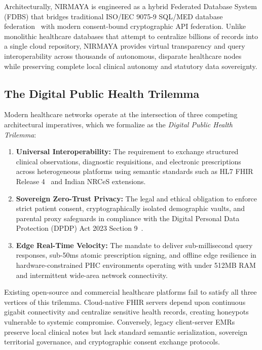 \documentclass[journal,twocolumn]{IEEEtran}
\begin{document}
Architecturally, NIRMAYA is engineered as a hybrid Federated Database System (FDBS) that bridges traditional ISO/IEC 9075-9 SQL/MED database federation~\cite{iso_sql_med} with modern consent-bound cryptographic API federation. Unlike monolithic healthcare databases that attempt to centralize billions of records into a single cloud repository, NIRMAYA provides virtual transparency and query interoperability across thousands of autonomous, disparate healthcare nodes while preserving complete local clinical autonomy and statutory data sovereignty.

\subsection{The Digital Public Health Trilemma}
Modern healthcare networks operate at the intersection of three competing architectural imperatives, which we formalize as the \emph{Digital Public Health Trilemma}:
\begin{enumerate}
    \item \textbf{Universal Interoperability:} The requirement to exchange structured clinical observations, diagnostic requisitions, and electronic prescriptions across heterogeneous platforms using semantic standards such as HL7 FHIR Release 4~\cite{hl7_fhir_r4} and Indian NRCeS extensions.
    \item \textbf{Sovereign Zero-Trust Privacy:} The legal and ethical obligation to enforce strict patient consent, cryptographically isolated demographic vaults, and parental proxy safeguards in compliance with the Digital Personal Data Protection (DPDP) Act 2023 Section 9~\cite{dpdp_act_2023}.
    \item \textbf{Edge Real-Time Velocity:} The mandate to deliver sub-millisecond query responses, sub-50ms atomic prescription signing, and offline edge resilience in hardware-constrained PHC environments operating with under 512MB RAM and intermittent wide-area network connectivity.
\end{enumerate}

Existing open-source and commercial healthcare platforms fail to satisfy all three vertices of this trilemma. Cloud-native FHIR servers depend upon continuous gigabit connectivity and centralize sensitive health records, creating honeypots vulnerable to systemic compromise. Conversely, legacy client-server EMRs preserve local clinical notes but lack standard semantic serialization, sovereign territorial governance, and cryptographic consent exchange protocols.
\end{document}
